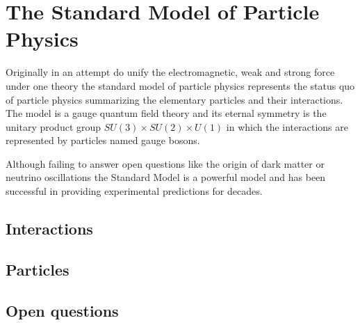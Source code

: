 \chapter{The Standard Model of Particle Physics}

Originally in an attempt do unify the electromagnetic, weak and strong force under one theory the standard model of particle physics represents the status quo of particle physics summarizing the elementary particles and their interactions.
The model is a gauge quantum field theory and its eternal symmetry is the unitary product group $SU(3) \times SU(2) \times U(1)$ in which the interactions are represented by particles named gauge bosons.

Although failing to answer open questions like the origin of dark matter or neutrino oscillations the Standard Model is a powerful model and has been successful in providing experimental predictions for decades.

\section{Interactions}

\section{Particles}

\section{Open questions}